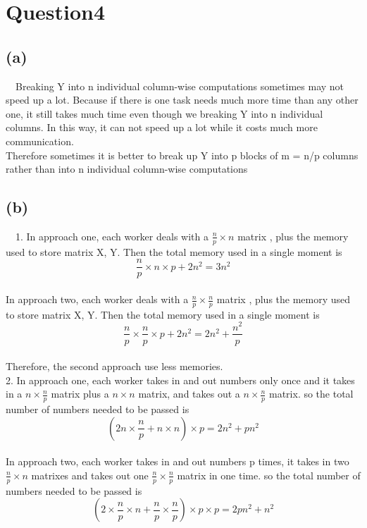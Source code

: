 \documentclass{article}\usepackage[]{graphicx}\usepackage[]{color}
\begin{document}
\section{Question4}
\subsection{(a)}
\quad \ \ Breaking Y into n individual column-wise computations sometimes may not speed up a lot. Because if there is one task needs much more time than any other one, it still takes much time even though we breaking Y into n individual columns. In this way, it can not speed up a lot while it costs much more communication. \\

Therefore sometimes it is better to break up Y into p blocks of m = n/p columns rather than into n individual column-wise computations

\subsection{(b)}
\quad \ \ 1. In approach one, each worker deals with a $\frac{n}{p}\times n$ matrix , plus the memory used to store matrix X, Y. Then the total memory used in a single moment is 
$$\frac{n}{p}\times n\times p+2n^2=3n^2$$ \\

In approach two, each worker deals with a $\frac{n}{p}\times \frac{n}{p}$ matrix , plus the memory used to store matrix X, Y. Then the total memory used in a single moment is 
$$\frac{n}{p}\times \frac{n}{p}\times p+2n^2=2n^2+\frac{n^2}{p}$$ \\

Therefore, the second approach use less memories.\\

2. In approach one, each worker takes in and out numbers only once and it takes in a $n\times \frac{n}{p}$ matrix plus a $n\times n$ matrix, and takes out a $n\times \frac{n}{p}$ matrix. so the total number of numbers needed to be passed is 
$$(2n\times \frac{n}{p}+n\times n)\times p=2n^2+pn^2$$ \\

In approach two, each worker takes in and out numbers p times, it takes in two $\frac{n}{p}\times n$ matrixes and takes out one $\frac{n}{p}\times \frac{n}{p}$ matrix in one time. so the total number of numbers needed to be passed is 
$$(2\times \frac{n}{p}\times n+\frac{n}{p}\times \frac{n}{p})\times p \times p=2pn^2+n^2$$ \\
\end{document}
